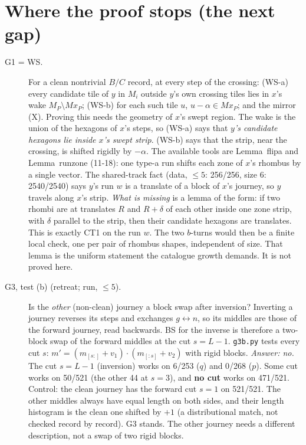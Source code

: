 \section{Where the proof stops (the next gap)}\label{sec:gap}
\begin{description}
\item[G1 = WS.] For a clean nontrivial $B/C$ record, at every step of the crossing: (WS-a) every candidate tile of $y$ in $M_i$ outside $y$'s own crossing tiles lies in $x$'s wake $M_P\setminus Mx_P$; (WS-b) for each such tile $u$, $u-\alpha\in Mx_P$; and the mirror (X).
Proving this needs the geometry of $x$'s swept region. The wake is the union of the hexagons of $x$'s steps, so (WS-a) says that \emph{$y$'s candidate hexagons lie inside $x$'s swept strip}. (WS-b) says that the strip, near the crossing, is shifted rigidly by $-\alpha$.
The available tools are Lemma~flipa and Lemma~runzone (11-18): one type-a run shifts each zone of $x$'s rhombus by a single vector. The shared-track fact (data, $\le5$: 256/256, size 6: 2540/2540) says $y$'s run $w$ is a translate of a block of $x$'s journey, so $y$ travels along $x$'s strip.
\emph{What is missing} is a lemma of the form: if two rhombi are at translates $R$ and $R+\delta$ of each other inside one zone strip, with $\delta$ parallel to the strip, then their candidate hexagons are translates. This is exactly CT1 on the run $w$. The two $b$-turns would then be a finite local check, one per pair of rhombus shapes, independent of size.
That lemma is the uniform statement the catalogue growth demands. It is not proved here.
\item[G3, test (b) (retreat; run, $\le5$).] Is the \emph{other} (non-clean) journey a block swap after inversion? Inverting a journey reverses its steps and exchanges $g\leftrightarrow n$, so its middles are those of the forward journey, read backwards.
BS for the inverse is therefore a two-block swap of the forward middles at the cut $s=L-1$. \texttt{g3b.py} tests every cut $s$: $m'=(m_{[s:]}+v_1)\cdot(m_{[:s]}+v_2)$ with rigid blocks.
\emph{Answer: no.} The cut $s=L-1$ (inversion) works on 6/253 ($q$) and 0/268 ($p$). Some cut works on 50/521 (the other 44 at $s=3$), and \textbf{no cut} works on 471/521. Control: the clean journey has the forward cut $s=1$ on 521/521.
The other middles always have equal length on both sides, and their length histogram is the clean one shifted by $+1$ (a distributional match, not checked record by record). G3 stands. The other journey needs a different description, not a swap of two rigid blocks.
\end{description}

